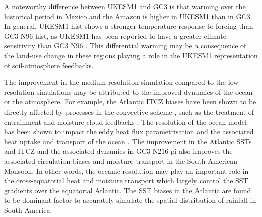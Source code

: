 A noteworthy difference between UKESM1 and GC3 is that warming over the historical period in Mexico and the Amazon is higher in UKESM1 than in GC3. In general, UKESM1-hist shows a stronger temperature response to forcing than GC3 N96-hist, as UKESM1 has been reported to have a  greater climate sensitivity than GC3 N96 \citep{andrews2019,sellar2019}.  This differential warming may be a consequence of the land-use change in these regions playing a role in the UKESM1 representation of soil-atmosphere feedbacks. %


The improvement in the medium resolution simulation compared to the low-resolution simulations may  be attributed to the improved dynamics of the ocean or the atmosphere. %
For example, the Atlantic ITCZ biases have been shown to be directly affected by processes in the convective scheme \citep{bellucci2010}, such as the treatment of entrainment and moisture-cloud feedbacks \citep{oueslati2013,li2014}. 
The resolution of the ocean model has been shown to impact the eddy heat flux parametrisation and the associated heat uptake and transport of the ocean  \citep{kuhlbrodt2018}. The improvement in the Atlantic SSTs and ITCZ and the associated dynamics in GC3 N216-pi also improves the associated circulation biases and moisture transport in the South American Monsoon. In other words, the oceanic resolution may play an important role in the cross-equatorial heat and moisture transport which largely control the SST gradients over the equatorial Atlantic. The SST biases in the Atlantic are found to be dominant factor to accurately simulate the spatial distribution of rainfall in South America.



